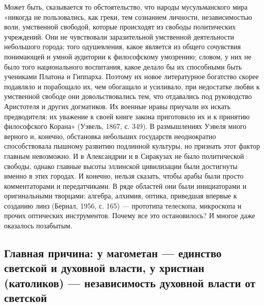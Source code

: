 Может быть,  сказывается то обстоятельство, что  народы мусульманского
мира  «никогда не  пользовались,  как греки,  тем сознанием  личности,
независимостью  воли,  умственной   свободой,  которые  происходят  из
свободы  политических  учреждений.  Они не  чувствовали  заразительной
умственной  деятельности небольшого  города;  того одушевления,  какое
является  из   общего  сочувствия  понимающей  и   умной  аудитории  к
философскому  умозрению;  словом, у  них  не  было того  национального
воспитания, какое  делало бы  их способными  быть учениками  Платона и
Гиппарха. Поэтому  их новое литературное богатство  скорее подавляло и
порабощало  их, чем  обогащало  и усиливало,  при  недостатке любви  к
умственной  свободе  они  довольствовались  тем,  что  отдавались  под
руководство Аристотеля и других  догматиков. Их военные нравы приучали
их искать предводителя;  их уважение к своей  книге закона приготовило
их  и  к принятию  философского  Корана»  (Уэвель,  1867, с.  349).  В
размышлениях  Уэвеля много  верного и,  конечно, обстановка  небольших
государств  неоднократно  способствовала  пышному  развитию  подлинной
культуры, но признать этот фактор  главным невозможно. И в Александрии
и  в Сиракузах  не было  политической свободы,  однако главные  высоты
эллинской  цивилизации  были  достигнуты  именно  в  этих  городах.  И
конечно,  нельзя сказать,  чтобы  арабы были  просто комментаторами  и
передатчиками. В  ряде областей они были  инициаторами и оригинальными
творцами: алгебра, алхимия, оптика,  приведшая впервые к созданию линз
(Бернал, 1956,  с. 165) ---  прототипа телескопа, микроскопа  и прочих
оптических инструментов.  Почему все  это остановилось? И  многое даже
оказалось позабытым.

\subsection{Главная  причина:  у  магометан ---  единство  светской  и
духовной  власти, у  христиан (католиков)  --- независимость  духовной
власти от светской}

